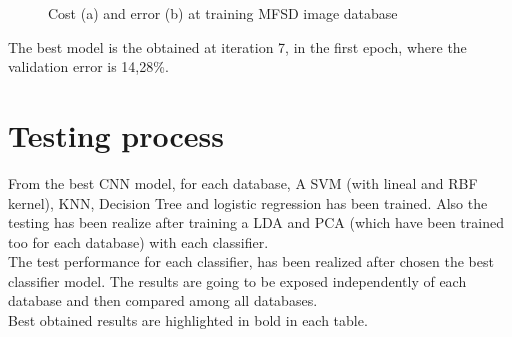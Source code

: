 \begin{figure}[htb]
\centering
\caption{Cost (a) and error (b) at training MFSD image database}
\label{fig:ejecucion2_mfsd_train}
\end{figure}

The best model is the obtained at iteration 7, in the first epoch, where the validation error is 14,28\%.\\

\section{Testing process}
From the best CNN model, for each database, A SVM (with lineal and RBF kernel), KNN, Decision Tree and logistic regression has been trained. Also the testing has been realize after training a LDA and PCA (which have been trained too for each database) with each classifier.\\

The test performance for each classifier, has been realized after chosen the best classifier model.  The results are going to be exposed independently of each database and then compared among all databases.\\

Best obtained results are highlighted in bold in each table.\\

